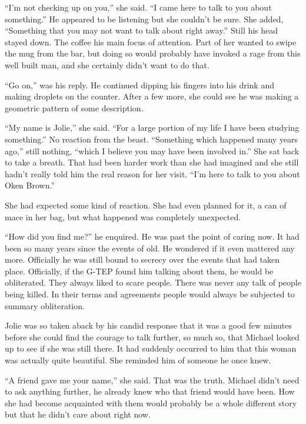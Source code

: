 ``I'm not checking up on you,'' she said.  ``I came here to talk to you about something.''  He appeared to be listening but she couldn't be sure.  She added, ``Something that you may not want to talk about right away.''  Still his head stayed down.  The coffee his main focus of attention.  Part of her wanted to swipe the mug from the bar, but doing so would probably have invoked a rage from this well built man, and she certainly didn't want to do that.

``Go on,'' was his reply.  He continued dipping his fingers into his drink and making droplets on the counter.  After a few more, she could see he was making a geometric pattern of some description.

``My name is Jolie,'' she said.  ``For a large portion of my life I have been studying something.''  No reaction from the beast.  ``Something which happened many years ago,'' still nothing, ``which I believe you may have been involved in.''  She sat back to take a breath.  That had been harder work than she had imagined and she still hadn't really told him the real reason for her visit.  ``I'm here to talk to you about Oken Brown.''  

She had expected some kind of reaction.  She had even planned for it, a can of mace in her bag, but what happened was completely unexpected.

``How did you find me?'' he enquired.  He was past the point of caring now.  It had been so many years since the events of old.  He wondered if it even mattered any more.  Officially he was still bound to secrecy over the events that had taken place.  Officially, if the G-TEP found him talking about them, he would be obliterated.  They always liked to scare people.  There was never any talk of people being killed.  In their terms and agreements people would always be subjected to summary obliteration.

Jolie was so taken aback by his candid response that it was a good few minutes before she could find the courage to talk further, so much so, that Michael looked up to see if she was still there.  It had suddenly occurred to him that this woman was actually quite beautiful.  She reminded him of someone he once knew.  

``A friend gave me your name,'' she said.  That was the truth.     Michael didn't need to ask anything further, he already knew who that friend would have been.  How she had become acquainted with them would probably be a whole different story but that he didn't care about right now.  

